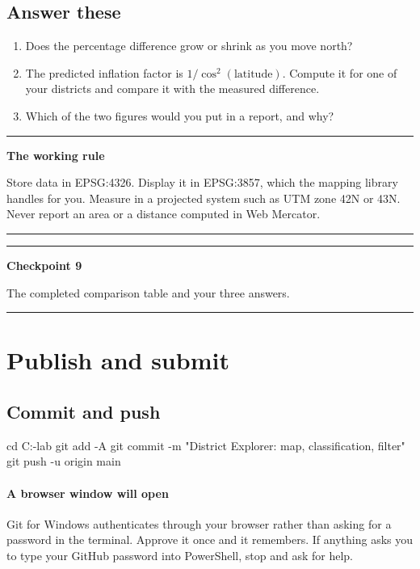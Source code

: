 \documentclass{article}
\newenvironment{keypoint}[1]
  {\par\vspace{.7em}\noindent\rule{\linewidth}{.6pt}\par\vspace{.15em}
   \noindent\textbf{#1}\par\nobreak\vspace{-.3em}}
  {\par\vspace{.15em}\noindent\rule{\linewidth}{.6pt}\par\vspace{.7em}}
\begin{document}
\subsection{Answer these}

\begin{enumerate}
  \item Does the percentage difference grow or shrink as you move north?
  \item The predicted inflation factor is $1/\cos^{2}(\mathrm{latitude})$.
        Compute it for one of your districts and compare it with the
        measured difference.
  \item Which of the two figures would you put in a report, and why?
\end{enumerate}

\begin{keypoint}{The working rule}
Store data in EPSG:4326. Display it in EPSG:3857, which the mapping
library handles for you. Measure in a projected system such as UTM zone
42N or 43N. Never report an area or a distance computed in Web Mercator.
\end{keypoint}


\begin{keypoint}{Checkpoint 9}
The completed comparison table and your three answers.
\end{keypoint}


\section{Publish and submit}

\subsection{Commit and push}

\begin{code}
cd C:\webgis-lab
git add -A
git commit -m "District Explorer: map, classification, filter"
git push -u origin main
\end{code}

\paragraph{A browser window will open}
Git for Windows authenticates through your browser rather than asking
for a password in the terminal. Approve it once and it remembers. If
anything asks you to type your GitHub password into PowerShell, stop and
ask for help.
\end{document}
